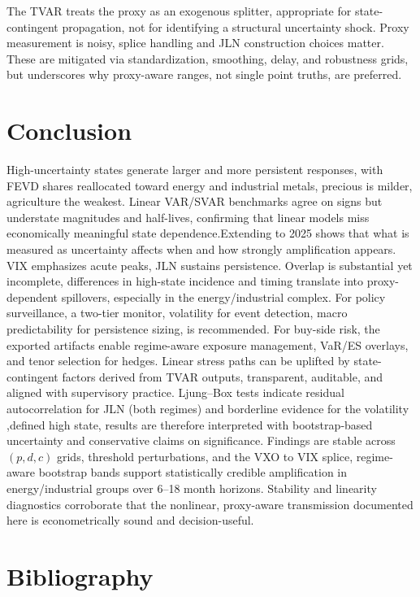 \documentclass[
  11pt,
]{article}
\begin{document}
The TVAR treats the proxy as an exogenous splitter, appropriate for state-contingent propagation, not for identifying a structural uncertainty shock. Proxy measurement is noisy, splice handling and JLN construction choices matter. These are mitigated via standardization, smoothing, delay, and robustness grids, but underscores why proxy-aware ranges, not single point truths, are preferred.

\section{Conclusion}\label{sec:conclusion}

High-uncertainty states generate larger and more persistent responses, with FEVD shares reallocated toward energy and industrial metals, precious is milder, agriculture the weakest. Linear VAR/SVAR benchmarks agree on signs but understate magnitudes and half-lives, confirming that linear models miss economically meaningful state dependence.Extending to 2025 shows that what is measured as uncertainty affects when and how strongly amplification appears. VIX emphasizes acute peaks, JLN sustains persistence. Overlap is substantial yet incomplete, differences in high-state incidence and timing translate into proxy-dependent spillovers, especially in the energy/industrial complex.
For policy surveillance, a two-tier monitor, volatility for event detection, macro predictability for persistence sizing, is recommended. For buy-side risk, the exported artifacts enable regime-aware exposure management, VaR/ES overlays, and tenor selection for hedges. Linear stress paths can be uplifted by state-contingent factors derived from TVAR outputs, transparent, auditable, and aligned with supervisory practice. Ljung--Box tests indicate residual autocorrelation for JLN (both regimes) and borderline evidence for the volatility ,defined high state, results are therefore interpreted with bootstrap‑based uncertainty and conservative claims on significance.
Findings are stable across \((p,d,c)\) grids, threshold perturbations, and the VXO to VIX splice, regime-aware bootstrap bands support statistically credible amplification in energy/industrial groups over 6--18 month horizons. Stability and linearity diagnostics corroborate that the nonlinear, proxy-aware transmission documented here is econometrically sound and decision-useful.

\clearpage
{}

\section*{Bibliography}\label{bibliography}
\end{document}
